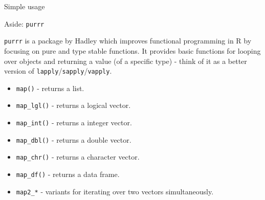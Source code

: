 \documentclass[11pt,ignorenonframetext,]{beamer}
\newenvironment{Shaded}{}{}
\newcommand{\KeywordTok}[1]{\textcolor[rgb]{0.00,0.44,0.13}{\textbf{{#1}}}}
\newcommand{\DataTypeTok}[1]{\textcolor[rgb]{0.56,0.13,0.00}{{#1}}}
\newcommand{\DecValTok}[1]{\textcolor[rgb]{0.25,0.63,0.44}{{#1}}}
\newcommand{\StringTok}[1]{\textcolor[rgb]{0.25,0.44,0.63}{{#1}}}
\newcommand{\NormalTok}[1]{{#1}}
\let\oldShaded\Shaded
\let\endoldShaded\endShaded
\renewenvironment{Shaded}{\footnotesize\begin{spacing}{0.9}\oldShaded}{\endoldShaded\end{spacing}}
\begin{document}
\begin{frame}[fragile]{Simple usage}

\begin{Shaded}
\end{Shaded}

\end{frame}

\begin{frame}[fragile]{Aside: \texttt{purrr}}

\texttt{purrr} is a package by Hadley which improves functional
programming in R by focusing on pure and type stable functions. It
provides basic functions for looping over objects and returning a value
(of a specific type) - think of it as a better version of
\texttt{lapply}/\texttt{sapply}/\texttt{vapply}.

\begin{itemize}
\item
  \texttt{map()} - returns a list.
\item
  \texttt{map\_lgl()} - returns a logical vector.
\item
  \texttt{map\_int()} - returns a integer vector.
\item
  \texttt{map\_dbl()} - returns a double vector.
\item
  \texttt{map\_chr()} - returns a character vector.
\item
  \texttt{map\_df()} - returns a data frame.
\item
  \texttt{map2\_*} - variants for iterating over two vectors
  simultaneously.
\end{itemize}

\end{frame}
\end{document}

